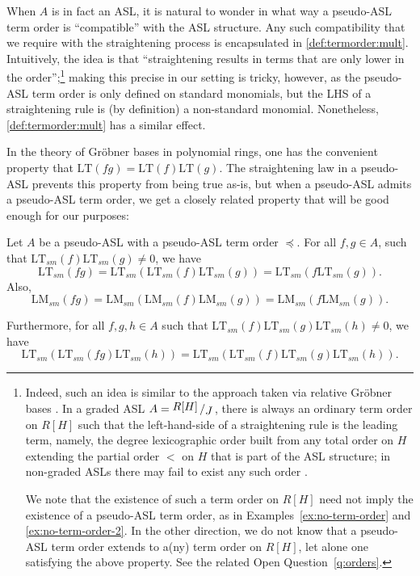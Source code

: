 \documentclass[11pt,reqno]{amsart}
\newcommand{\bigslant}[2]{{\raisebox{.2em}{$#1$}\left/\raisebox{-.2em}{$#2$}\right.}}
\newcommand{\lt}{\text{LT}}
\newcommand{\lmsm}{\text{LM}_{sm}}
\newcommand{\ltsm}{\text{LT}_{sm}}
\theoremstyle{definition}
\numberwithin{equation}{section}
\begin{document}
\begin{remark}
When $A$ is in fact an ASL, it is natural to wonder in what way a pseudo-ASL term order is ``compatible'' with the ASL structure. Any such compatibility that we require with the straightening process is encapsulated in \ref{def:termorder:mult}. Intuitively, the idea is that ``straightening results in terms that are only lower in the order'';\footnote{Indeed, such an idea is similar to the approach taken via relative Gröbner bases \cite{HOS}. In a graded ASL $A = \bigslant{R[H]}{J}$, there is always an ordinary term order on $R[H]$ such that the left-hand-side of a straightening rule is the leading term, namely, the degree lexicographic order built from any total order on $H$ extending the partial order $<$ on $H$ that is part of the ASL structure; in non-graded ASLs there may fail to exist any such order \cite{GrabePauer}. 

We note that the existence of such a term order on $R[H]$ need not imply the existence of a pseudo-ASL term order, as in Examples~\ref{ex:no-term-order} and \ref{ex:no-term-order-2}. In the other direction, we do not know that a pseudo-ASL term order extends to a(ny) term order on $R[H]$, let alone one satisfying the above property. See the related Open Question~\ref{q:orders}.}
making this precise in our setting is tricky, however, as the pseudo-ASL term order is only defined on standard monomials, but the LHS of a straightening rule is (by definition) a non-standard monomial. Nonetheless, \ref{def:termorder:mult} has a similar effect.
\end{remark}

In the theory of Gröbner bases in polynomial rings, one has the convenient property that $\lt(fg) = \lt(f) \lt(g)$. The straightening law in a pseudo-ASL prevents this property from being true as-is, but when a pseudo-ASL admits a pseudo-ASL term order, we get a closely related property that will be good enough for our purposes:

\begin{proposition} \label{prop:mult} Let $A$ be a pseudo-ASL with a pseudo-ASL term order $\preceq$. For all $f, g \in A$, such that $\ltsm(f) \ltsm(g) \neq 0$, we have
\begin{equation}
\label{obs:mult-eqn1}
\ltsm(fg) = \ltsm(\ltsm(f) \ltsm(g)) = \ltsm(f \ltsm(g)).
\end{equation}
Also,
\begin{equation}
\label{obs:mult-eqn2}
\lmsm(fg) = \lmsm(\lmsm(f) \lmsm(g)) = \lmsm(f \lmsm(g)).
\end{equation}

Furthermore, for all $f,g,h \in A$ such that $\ltsm(f) \ltsm(g) \ltsm(h) \neq 0$, we have 
\begin{equation} \label{obs:mult-eqn3}
\ltsm(\ltsm(fg)\ltsm(h)) = \ltsm(\ltsm(f) \ltsm(g) \ltsm(h)).
\end{equation}
\end{proposition}
\end{document}
